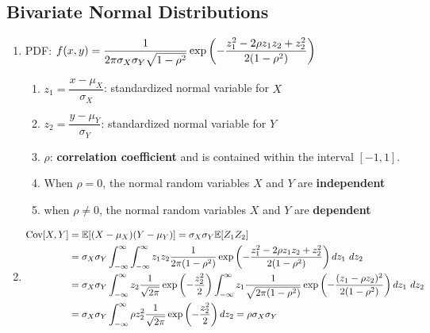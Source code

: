 \subsection{Bivariate Normal Distributions}

\begin{enumerate}[series=binvar-normal]
    \item PDF:
    $
        f (x, y)
        = \dfrac{1}{ 2\pi\sigma_X \sigma_Y \sqrt{1 - \rho^2} }
        \exp \left(
            - \dfrac{z^2_1 - 2\rho z_1z_2 + z^2_2 }{2(1 - \rho^2)}
        \right)
    $
    \hfill \cite{statistics/book/Statistics-for-Data-Scientists/Maurits-Kaptein}
    \begin{enumerate}
        \item $z_1 = \dfrac{x - \mu_X}{\sigma_X}$: standardized normal variable for $X$
        \hfill \cite{statistics/book/Statistics-for-Data-Scientists/Maurits-Kaptein}

        \item $z_2 = \dfrac{y - \mu_Y}{\sigma_Y}$: standardized normal variable for $Y$
        \hfill \cite{statistics/book/Statistics-for-Data-Scientists/Maurits-Kaptein}

        \item $\rho$: \textbf{correlation coefficient} and is contained within the interval $[-1, 1]$.
        \hfill \cite{statistics/book/Statistics-for-Data-Scientists/Maurits-Kaptein}

        \item When $\rho = 0$, the normal random variables $X$ and $Y$ are \textbf{independent}
        \hfill \cite{statistics/book/Statistics-for-Data-Scientists/Maurits-Kaptein}

        \item when $\rho \neq 0$, the normal random variables $X$ and $Y$ are \textbf{dependent}
        \hfill \cite{statistics/book/Statistics-for-Data-Scientists/Maurits-Kaptein}
    \end{enumerate}

    \item 
    $
        \begin{aligned}
            \tCov[X, Y] 
            & = \mbbE[(X - \mu _X )(Y - \mu _Y )]
            = \sigma _X \sigma _Y \mbbE[Z_1 Z_2] \\
            &= \sigma _X \sigma _Y \dint^\infty_{-\infty} \dint^\infty_{-\infty} z_1z_2 \dfrac{1}{2\pi (1-\rho^2)} \exp \dParenBrac{ - \dfrac{z^2_1-2\rho z_1 z_2+z^2_2} {2(1-\rho^2)} } dz_1\ dz_2\\
            &= \sigma _X \sigma _Y \dint^\infty_{-\infty} z_2 \dfrac{1}{\sqrt{2\pi}}  \exp \dParenBrac{ - \dfrac{z^2_2} {2} } \dint^\infty_{-\infty} z_1 \dfrac{1}{\sqrt{2\pi (1-\rho^2)}} \exp \dParenBrac{ - \dfrac{(z_1-\rho z_2)^2 }{2(1-\rho^2)} } dz_1\ dz_2 \\
            &= \sigma_X \sigma_Y \dint^\infty_{-\infty} \rho z^2_2 \dfrac{1}{\sqrt{2\pi}}  \exp \dParenBrac{ - \dfrac{z^2_2}{ 2} } dz_2 
            = \rho \sigma_X \sigma_Y
        \end{aligned}
    $
    \hfill \cite{statistics/book/Statistics-for-Data-Scientists/Maurits-Kaptein}


\end{enumerate}
